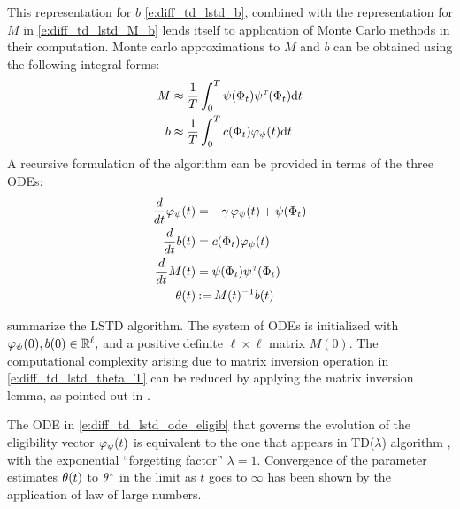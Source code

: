 This representation for $b$ \eqref{e:diff_td_lstd_b}, combined with the representation for $M$ in \eqref{e:diff_td_lstd_M_b} lends itself to application of Monte Carlo methods in their computation. Monte carlo approximations to $M$ and $b$ can be obtained using the following integral forms:
\begin{subequations}
\begin{align}
M &\approx \frac{1}{T} \int_0^T  \basis(\markovstate_t) \basis^\transpose(\markovstate_t) \ud t
\label{e:diff_td_lstd_M_T}
\\
b & \approx  \frac{1}{T} \int_0^T c(\markovstate_t) \eligibvector_\basis(t) \ud t
\label{e:diff_td_lstd_b_T}
\end{align}
\end{subequations}
A recursive formulation of the algorithm can be provided in terms of the three ODEs:
\begin{subequations}
\begin{align}
\ddt \eligibvector_\basis (t) &= - \discount\, \eligibvector_\basis(t) + \basis (\markovstate_t) 
\label{e:diff_td_lstd_ode_eligib} \\
\ddt b(t) &=  c(\markovstate_t)\eligibvector_\basis(t)
 \label{e:diff_td_lstd_ode_b}\\
\ddt M(t) &= \basis(\markovstate_t) \basis^\transpose(\markovstate_t) 
\label{e:diff_td_lstd_ode_M} \\
\param(t) &\eqdef  M(t)^{-1} b(t)
\label{e:diff_td_lstd_theta_T}
\end{align}
\end{subequations}

 summarize the LSTD algorithm. The system of ODEs is initialized with $\varphi_\psi(0), b(0) \in \mathbb{R}^\ell,$ and a positive definite $\ell \times \ell$ matrix $M(0)$. The computational complexity arising due to matrix inversion operation in \eqref{e:diff_td_lstd_theta_T} can be reduced by applying the matrix inversion lemma, as pointed out in \cite{ctcn}.  %

The ODE in \eqref{e:diff_td_lstd_ode_eligib} that governs the evolution of the eligibility vector $\varphi_\psi(t)$ is equivalent to the one that appears in TD($\lambda$) algorithm \cite{sut88}, with the exponential ``forgetting factor'' $\lambda = 1$. Convergence of the parameter estimates $\theta(t)$ to $\theta^*$ in the limit as $t$ goes to $\infty$ has been shown by the application of law of large numbers. %

